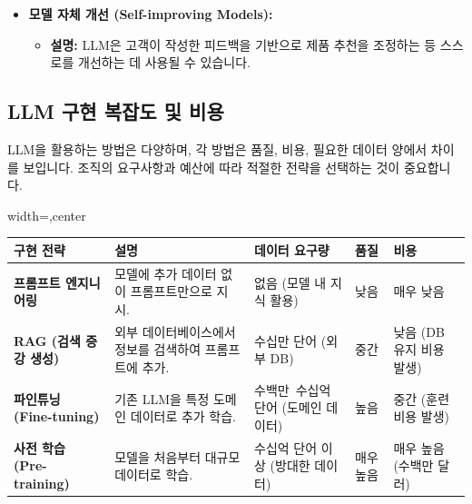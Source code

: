 \documentclass[11pt,a4paper]{article}
\theoremstyle{definition}
\begin{document}
\begin{itemize}
    \item \textbf{모델 자체 개선 (Self-improving Models):}
    \begin{itemize}
        \item \textbf{설명:} LLM은 고객이 작성한 피드백을 기반으로 제품 추천을 조정하는 등 스스로를 개선하는 데 사용될 수 있습니다.
    \end{itemize}
\end{itemize}

\subsection{LLM 구현 복잡도 및 비용}

LLM을 활용하는 방법은 다양하며, 각 방법은 품질, 비용, 필요한 데이터 양에서 차이를 보입니다. 조직의 요구사항과 예산에 따라 적절한 전략을 선택하는 것이 중요합니다.

\begin{adjustbox}{width=\textwidth,center}
\begin{tabular}{lllll}
\toprule
\textbf{구현 전략} & \textbf{설명} & \textbf{데이터 요구량} & \textbf{품질} & \textbf{비용} \\
\midrule
\textbf{프롬프트 엔지니어링} & 모델에 추가 데이터 없이 프롬프트만으로 지시. & 없음 (모델 내 지식 활용) & 낮음 & 매우 낮음 \\
\textbf{RAG (검색 증강 생성)} & 외부 데이터베이스에서 정보를 검색하여 프롬프트에 추가. & 수십만 단어 (외부 DB) & 중간 & 낮음 (DB 유지 비용 발생) \\
\textbf{파인튜닝 (Fine-tuning)} & 기존 LLM을 특정 도메인 데이터로 추가 학습. & 수백만~수십억 단어 (도메인 데이터) & 높음 & 중간 (훈련 비용 발생) \\
\textbf{사전 학습 (Pre-training)} & 모델을 처음부터 대규모 데이터로 학습. & 수십억 단어 이상 (방대한 데이터) & 매우 높음 & 매우 높음 (수백만 달러) \\
\bottomrule
\end{tabular}
\end{adjustbox}
\end{document}
